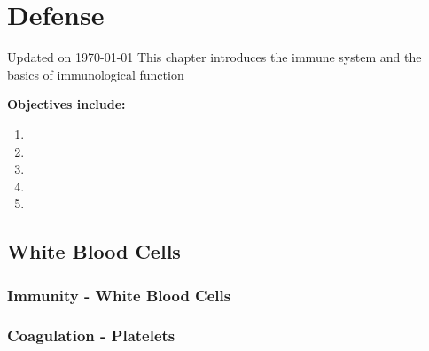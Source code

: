 \chapter{Defense}\label{chp:defense}
Updated on \today
\minitoc
This chapter introduces the immune system and the basics of immunological function


\vspace{5mm}

\textbf{Objectives include:}
\begin{enumerate}
    \item
    \item
    \item
    \item
    \item
\end{enumerate}

\section{White Blood Cells}

\subsection{Immunity - White Blood Cells}

\subsection{Coagulation - Platelets}

\printbibliography[heading=subbibintoc]